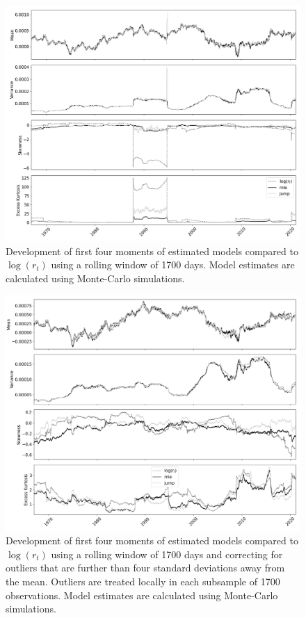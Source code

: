 \begin{figure}[H] 
    \centering
    \includegraphics[width=1.0\textwidth]{analysis/stylized_facts/images/rolling_moments.png}
    \caption{Development of first four moments of estimated models compared to $\log(r_t)$ using a rolling window of 1700 days. Model estimates are calculated using Monte-Carlo simulations.}
    \label{fig:stylized_facts_rolling_moments} 
\end{figure}

\begin{figure}[H] 
    \centering
    \includegraphics[width=1.0\textwidth]{analysis/stylized_facts/images/rolling_moments_outlier_corrected.png}
    \caption{Development of first four moments of estimated models compared to $\log(r_t)$ using a rolling window of 1700 days and correcting for outliers that are further than four standard deviations away from the mean. Outliers are treated locally in each subsample of 1700 observations. Model estimates are calculated using Monte-Carlo simulations.}
    \label{fig:stylized_facts_rolling_moments_outliers} 
\end{figure}


